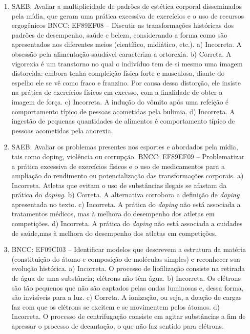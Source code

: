 \begin{enumerate}
\item
SAEB: Avaliar a multiplicidade de padrões de estética corporal
disseminados pela mídia, que geram uma prática excessiva de exercícios e
o uso de recursos ergogênicos
BNCC: EF89EF08 -- Discutir as transformações históricas dos padrões de
desempenho, saúde e beleza, considerando a forma como são apresentados
nos diferentes meios (científico, midiático, etc.).
a) Incorreta. A obsessão pela alimentação saudável caracteriza a ortorexia. 
b) Correta. A vigorexia é um transtorno no qual o indivíduo
tem de si mesmo uma imagem distorcida: embora tenha compleição
física forte e musculosa, diante do espelho ele se vê como fraco
e franzino. Por causa dessa distorção, ele insiste na prática de 
exercícios físicos em excesso, com a finalidade de obter a imagem 
de força.
c) Incorreta. A indução do vômito após uma refeição é comportamento típico de pessoas acometidas pela bulimia. 
d) Incorreta. A ingestão de pequenas quantidades de alimentos é comportamento típico de pessoas acometidas pela anorexia.

\item
SAEB: Avaliar os problemas presentes nos esportes e abordados pela
mídia, tais como doping, violência ou corrupção.
BNCC: EF89EF09 -- Problematizar a prática excessiva de exercícios
físicos e o uso de medicamentos para a ampliação do rendimento ou
potencialização das transformações corporais.
a) Incorreta. Atletas que evitam o uso de substâncias ilegais se afastam
da prática do \textit{doping}.
b) Correta. A alternativa corrobora a definição de \textit{doping} 
apresentada no texto. 
c) Incorreta. A prática do \textit{doping} não está associada a 
tratamentos médicos, mas à melhora do desempenho dos atletas em 
competições.
d) Incorreta. A prática do \textit{doping} não está associada
a cuidades de saúde,mas à melhora do desempenho dos atletas em 
competições.

\item
BNCC: EF09CI03 -- Identificar modelos que descrevem
a estrutura da matéria (constituição do átomo e composição de moléculas
simples) e reconhecer sua evolução histórica.
a)  Incorreta. O processo de liofilização consiste na retirada de água de
  uma substância; elétrons não têm água.
b)  Incorreta. Os elétrons são tão pequenos que não são captados pelas
  ondas luminosas e, dessa forma, são invisíveis para a luz.
c)  Correta. A ionização, ou seja, a doação de cargas faz com que os
  elétrons se excitem e se movimentem pelos átomos.
d)  Incorreta. O processo de centrifugação consiste em agitar substâncias
  a fim de apressar o processo de decantação, o que não faz sentido para
  elétrons.


\end{enumerate}
